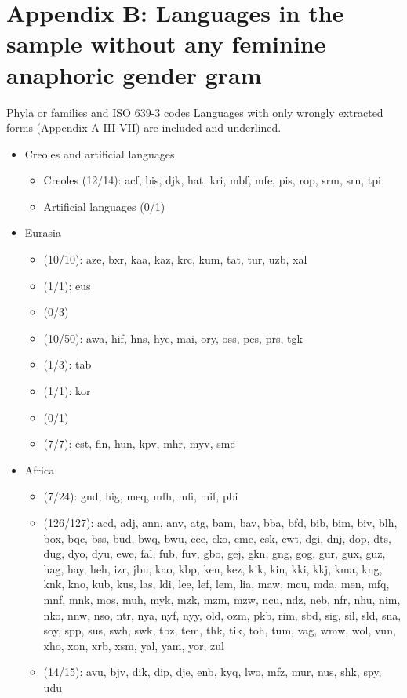 
\section*{Appendix B: Languages in the sample without any feminine anaphoric gender gram \normalfont [629 languages]}

\noindent Phyla or families and ISO 639-3 codes
\noindent Languages with only wrongly extracted forms (Appendix A III-VII) are included and underlined.

\begin{itemize}[label={},leftmargin=0cm,labelindent=5pt,itemindent=0pt]
  \item Creoles and artificial languages
    \begin{itemize}[label={},leftmargin=!,labelindent=5pt,itemindent=-15pt]
  	\item Creoles (12/14): acf, bis, djk, hat, kri, mbf, mfe, pis, rop, srm, srn, tpi
  	\item Artificial languages (0/1)
  \end{itemize}

  \item Eurasia
    \begin{itemize}[label={},leftmargin=!,labelindent=5pt,itemindent=-15pt]
  	\item {} (10/10): aze, bxr, kaa, kaz, krc, kum, tat, tur, uzb, xal
  	\item {} (1/1): eus
  	\item {} (0/3)
  	\item {} (10/50): awa, hif, hns, hye, mai, ory, oss, pes, prs, tgk
  	\item {} (1/3): tab
  	\item {} (1/1): kor
  	\item {} (0/1)
  	\item {} (7/7): est, fin, hun, kpv, mhr, myv, sme
  \end{itemize}

  \item Africa
    \begin{itemize}[label={},leftmargin=!,labelindent=5pt,itemindent=-15pt]
  	\item {} (7/24): gnd, hig, meq, mfh, mfi, mif, pbi
  	\item {} (126/127): acd, adj, ann, anv, atg, bam, bav, bba, bfd, bib, bim, biv, blh, box, bqc, bss, bud, bwq, bwu, cce, cko, cme, csk, cwt, dgi, dnj, dop, dts, dug, dyo, dyu, ewe, fal, fub, fuv, gbo, gej, gkn, gng, gog, gur, gux, guz, hag, hay, heh, izr, jbu, kao, kbp, ken, kez, kik, kin, kki, kkj, kma, kng, knk, kno, kub, kus, las, ldi, lee, lef, lem, lia, maw, mcu, mda, men, mfq, mnf, mnk, mos, muh, myk, mzk, mzm, mzw, ncu, ndz, neb, nfr, nhu, nim, nko, nnw, nso, ntr, nya, nyf, nyy, old, ozm, pkb, rim, sbd, sig, sil, sld, sna, soy, spp, sus, swh, swk, tbz, tem, thk, tik, toh, tum, vag, wmw, wol, vun, xho, xon, xrb, xsm, yal, yam, yor, zul
  	\item {} (14/15): avu, bjv, dik, dip, dje, enb, kyq, lwo, mfz, mur, nus, shk, spy, udu
    \end{itemize}


\end{itemize}
